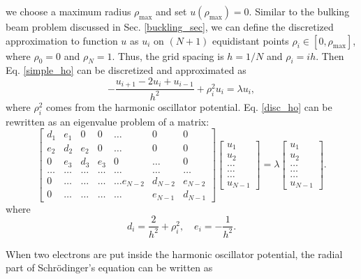 \documentclass{article}
\begin{document}
we choose a maximum radius $\rho_\mathrm{max}$ and set $u(\rho_\mathrm{max})=0$. 
Similar to the bulking beam problem discussed in Sec. \ref{buckling_sec}, 
we can define the discretized approximation to function $u$ as $u_i$ 
on $(N+1)$ equidistant points $\rho_i \in [0,\rho_\mathrm{max}]$, 
where $\rho_0=0$ and $\rho_N=1$. Thus, the grid spacing is $h=1/N$ and $\rho_i=ih$. 
Then Eq. \ref{simple_ho} can be discretized and approximated as 
\begin{equation}\label{disc_ho}
-\frac{u_{i+1} -2u_i +u_{i-1} }{h^2}+\rho_i^2u_i  = \lambda u_i,
\end{equation}
where $\rho_i^2$ comes from the harmonic oscillator potential. 
Eq. \ref{disc_ho} can be rewritten as an eigenvalue problem of a matrix: 
\begin{equation}
    \begin{bmatrix}d_1 & e_1 & 0   & 0    & \dots  &0     & 0 \\
	e_2 & d_2 & e_2 & 0    & \dots  &0     &0 \\
	0   & e_3 & d_3 & e_3  &0       &\dots & 0\\
	\dots  & \dots & \dots & \dots  &\dots      &\dots & \dots\\
	0   & \dots & \dots & \dots  &\dots  e_{N-2}     &d_{N-2} & e_{N-2}\\
	0   & \dots & \dots & \dots  &\dots       &e_{N-1} & d_{N-1}
	\end{bmatrix}  \begin{bmatrix} u_{1} \\
	u_{2} \\
	\dots\\ \dots\\ \dots\\
	u_{N-1}
	\end{bmatrix}=\lambda \begin{bmatrix} u_{1} \\
	u_{2} \\
	\dots\\ \dots\\ \dots\\
	u_{N-1}
	\end{bmatrix}.  
\label{eq:sematrix}
\end{equation}
where
\begin{equation}
d_i=\frac{2}{h^2}+\rho_i^2, \quad
e_i=-\frac{1}{h^2}.
\end{equation}
\par
When two electrons are put inside the harmonic oscillator potential, the radial part of Schr\"{o}dinger's equation can be written as 
\end{document}
